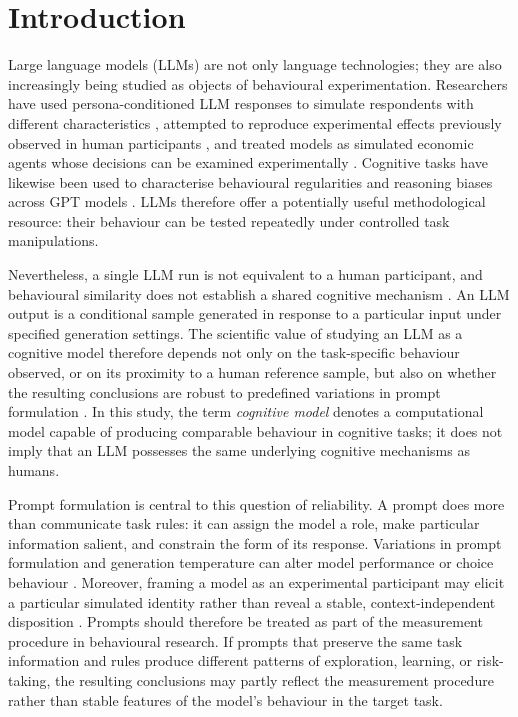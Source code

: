 \documentclass[logo,msc]{infthesis}
\begin{document}
\chapter{Introduction}

Large language models (LLMs) are not only language technologies; they are also increasingly being studied as objects of behavioural experimentation. Researchers have used persona-conditioned LLM responses to simulate respondents with different characteristics \cite{Argyle2023OutOfOneMany}, attempted to reproduce experimental effects previously observed in human participants \cite{Aher2023SimulateHumans}, and treated models as simulated economic agents whose decisions can be examined experimentally \cite{Horton2023HomoSilicus}. Cognitive tasks have likewise been used to characterise behavioural regularities and reasoning biases across GPT models \cite{Binz2023CognitivePsychologyGPT3,Hagendorff2023HumanLikeBiases}. LLMs therefore offer a potentially useful methodological resource: their behaviour can be tested repeatedly under controlled task manipulations.

Nevertheless, a single LLM run is not equivalent to a human participant, and behavioural similarity does not establish a shared cognitive mechanism \cite{Shanahan2023RolePlay}. An LLM output is a conditional sample generated in response to a particular input under specified generation settings. The scientific value of studying an LLM as a cognitive model therefore depends not only on the task-specific behaviour observed, or on its proximity to a human reference sample, but also on whether the resulting conclusions are robust to predefined variations in prompt formulation \cite{Loya2023PromptSensitivityDecision}. In this study, the term \emph{cognitive model} denotes a computational model capable of producing comparable behaviour in cognitive tasks; it does not imply that an LLM possesses the same underlying cognitive mechanisms as humans.

Prompt formulation is central to this question of reliability. A prompt does more than communicate task rules: it can assign the model a role, make particular information salient, and constrain the form of its response. Variations in prompt formulation and generation temperature can alter model performance or choice behaviour \cite{Loya2023PromptSensitivityDecision}. Moreover, framing a model as an experimental participant may elicit a particular simulated identity rather than reveal a stable, context-independent disposition \cite{Shanahan2023RolePlay}. Prompts should therefore be treated as part of the measurement procedure in behavioural research. If prompts that preserve the same task information and rules produce different patterns of exploration, learning, or risk-taking, the resulting conclusions may partly reflect the measurement procedure rather than stable features of the model's behaviour in the target task.
\end{document}
